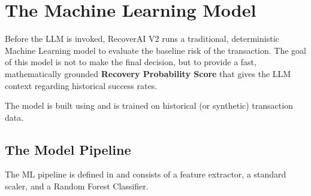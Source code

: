 
\section{The Machine Learning Model}

\begin{tcolorbox}[summarybox={\iconBulb[1.5] Lightweight Risk Scoring}]
\color{textdark}
Before the LLM is invoked, RecoverAI V2 runs a traditional, deterministic Machine Learning model to evaluate the baseline risk of the transaction. The goal of this model is not to make the final decision, but to provide a fast, mathematically grounded \textbf{Recovery Probability Score} that gives the LLM context regarding historical success rates.

The model is built using  and is trained on historical (or synthetic) transaction data.
\end{tcolorbox}

\vspace{0.8cm}

\subsection{The Model Pipeline}

The ML pipeline is defined in  and consists of a feature extractor, a standard scaler, and a Random Forest Classifier.

